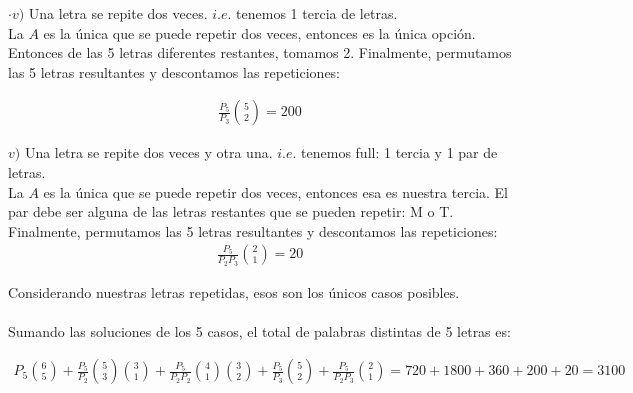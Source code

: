 \documentclass[letterpaper,11pt]{article}
\begin{document}
\begin{enumerate}
\begin{enumerate}[(a)]
        $\cdotp v )$ Una letra se repite dos veces. $i.e.$ tenemos 1 tercia de letras.\\
        La $A$ es la única que se puede repetir dos veces, entonces es la única opción.
        Entonces de las 5 letras diferentes restantes, tomamos 2.
        Finalmente, permutamos las 5 letras resultantes y descontamos las repeticiones:

        \begin{align*}
          \frac{P_5}{P_3} \binom{5}{2} = 200
        \end{align*}

        $v )$ Una letra se repite dos veces y otra una. $i.e.$ tenemos full: 1 tercia y 1 par de letras.\\
        La $A$ es la única que se puede repetir dos veces, entonces esa es nuestra tercia.
        El par debe ser alguna de las letras restantes que se pueden repetir: M o T.
        Finalmente, permutamos las 5 letras resultantes y descontamos las repeticiones:
        \begin{align*}
          \frac{P_5}{P_2 P_3} \binom{2}{1} = 20
        \end{align*}

        Considerando nuestras letras repetidas, esos son los únicos casos posibles. \\ \\
        Sumando las soluciones de los 5 casos, el total de palabras distintas de 5 letras es:

        \begin{align*}
          P_5 \binom{6}{5} + \frac{P_5}{P_2} \binom{5}{3} \binom{3}{1} + \frac{P_5}{P_2 P_2} \binom{4}{1} \binom{3}{2} + \frac{P_5}{P_3} \binom{5}{2} + \frac{P_5}{P_2 P_3} \binom{2}{1} = 720 + 1800 + 360 + 200 + 20 = 3100
        \end{align*}

      \end{enumerate}

  \end{enumerate}
\end{document}
